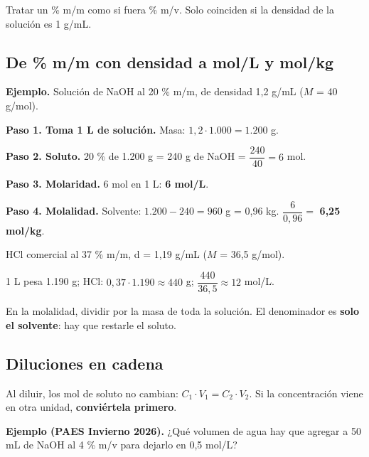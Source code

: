  
\begin{ojo} Tratar un \% m/m como si fuera \% m/v. Solo coinciden si la densidad de la solución es 1 g/mL.\end{ojo}
\subsection{De \% m/m con densidad a mol/L y mol/kg}
\textbf{Ejemplo.} Solución de NaOH al 20 \% m/m, de densidad 1,2 g/mL ($M$ = 40 g/mol).

 

\textbf{Paso 1. Toma 1 L de solución.} Masa: $1{,}2\cdot 1.000 = 1.200$ g.

 

\textbf{Paso 2. Soluto.} 20 \% de 1.200 g = 240 g de NaOH = $\dfrac{240}{40} = 6$ mol.

 

\textbf{Paso 3. Molaridad.} 6 mol en 1 L: \textbf{6 mol/L}.

 

\textbf{Paso 4. Molalidad.} Solvente: $1.200 - 240 = 960$ g = 0,96 kg. $\dfrac{6}{0{,}96} = $ \textbf{6,25 mol/kg}.

  
\begin{ejemplo} HCl comercial al 37 \% m/m, d = 1,19 g/mL ($M$ = 36,5 g/mol).\par 1 L pesa 1.190 g; HCl: $0{,}37\cdot 1.190 \approx 440$ g; $\dfrac{440}{36{,}5} \approx 12$ mol/L.\end{ejemplo}
 
\begin{ojo} En la molalidad, dividir por la masa de toda la solución. El denominador es \textbf{solo el solvente}: hay que restarle el soluto.\end{ojo}
\subsection{Diluciones en cadena}
Al diluir, los mol de soluto no cambian: $C_1\cdot V_1 = C_2\cdot V_2$. Si la concentración viene en otra unidad, \textbf{conviértela primero}.

 

\textbf{Ejemplo (PAES Invierno 2026).} ¿Qué volumen de agua hay que agregar a 50 mL de NaOH al 4 \% m/v para dejarlo en 0,5 mol/L?

